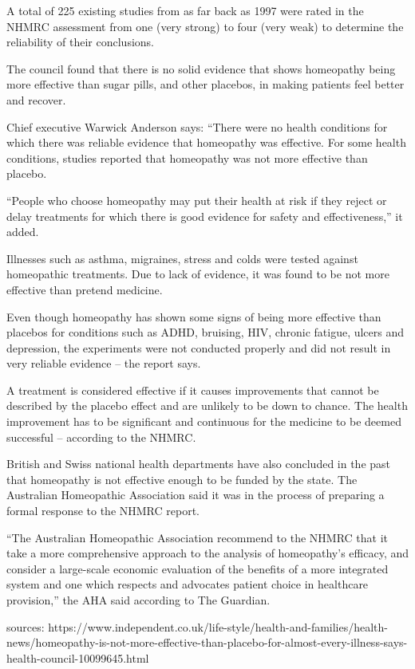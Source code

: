 \documentclass[a4paper, 11pt]{article}
\begin{document}
A total of 225 existing studies from as far back as 1997 were rated in the NHMRC assessment from one (very strong) to four (very weak) to determine the reliability of their conclusions.

The council found that there is no solid evidence that shows homeopathy being more effective than sugar pills, and other placebos, in making patients feel better and recover.

Chief executive Warwick Anderson says: “There were no health conditions for which there was reliable evidence that homeopathy was effective. For some health conditions, studies reported that homeopathy was not more effective than placebo.

“People who choose homeopathy may put their health at risk if they reject or delay treatments for which there is good evidence for safety and effectiveness,” it added.

Illnesses such as asthma, migraines, stress and colds were tested against homeopathic treatments. Due to lack of evidence, it was found to be not more effective than pretend medicine.


Even though homeopathy has shown some signs of being more effective than placebos for conditions such as ADHD, bruising, HIV, chronic fatigue, ulcers and depression, the experiments were not conducted properly and did not result in very reliable evidence – the report says.

A treatment is considered effective if it causes improvements that cannot be described by the placebo effect and are unlikely to be down to chance. The health improvement has to be significant and continuous for the medicine to be deemed successful – according to the NHMRC.

British and Swiss national health departments have also concluded in the past that homeopathy is not effective enough to be funded by the state. The Australian Homeopathic Association said it was in the process of preparing a formal response to the NHMRC report.

“The Australian Homeopathic Association recommend to the NHMRC that it take a more comprehensive approach to the analysis of homeopathy’s efficacy, and consider a large-scale economic evaluation of the benefits of a more integrated system and one which respects and advocates patient choice in healthcare provision,” the AHA said according to The Guardian.

sources: https://www.independent.co.uk/life-style/health-and-families/health-news/homeopathy-is-not-more-effective-than-placebo-for-almost-every-illness-says-health-council-10099645.html
\end{document}
